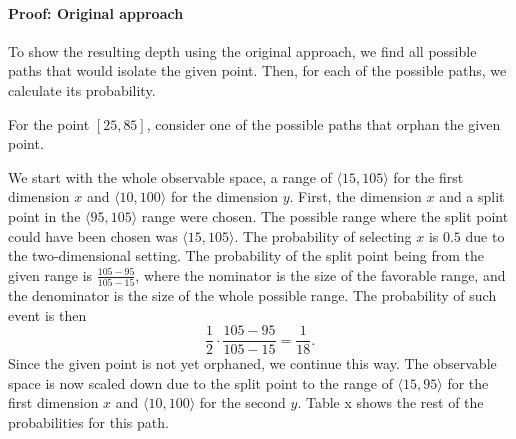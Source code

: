 \paragraph{Proof: Original approach}
To show the resulting depth using the original approach, we find all possible paths that would isolate the given point. Then, for each of the possible paths, we calculate its probability.




For the point $[25,85]$, consider one of the possible paths that orphan the given point.

We start with the whole observable space, a range of $\langle 15, 105\rangle$ for the first dimension $x$ and $\langle 10,100\rangle$ for the dimension $y$.
First, the dimension $x$ and a split point in the $\langle 95, 105\rangle$ range were chosen. The possible range where the split point could have been chosen was $\langle 15,105\rangle$.
The probability of selecting $x$ is $0.5$ due to the two-dimensional setting.
The probability of the split point being from the given range is $\frac{105-95}{105-15}$, where the nominator is the size of the favorable range, and the denominator is the size of the whole possible range.
The probability of such event is then $$\frac{1}{2}\cdot\frac{105-95}{105-15} = \frac{1}{18}.$$
Since the given point is not yet orphaned, we continue this way. The observable space is now scaled down due to the split point to the range of $\langle 15, 95\rangle$ for the first dimension $x$ and $\langle 10,100\rangle$ for the second $y$. Table x shows the rest of the probabilities for this path.

